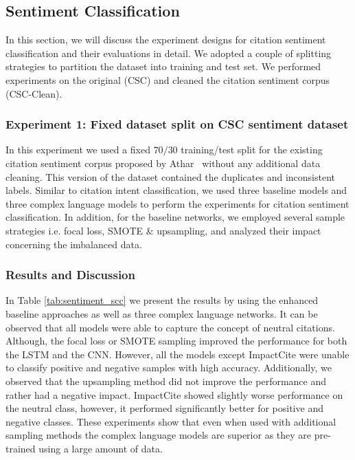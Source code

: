 \documentclass[runningheads]{llncs}
\begin{document}
\subsection{Sentiment Classification}
In this section, we will discuss the experiment designs for citation sentiment classification and their evaluations in detail. We adopted a couple of splitting strategies to partition the dataset into training and test set. We performed experiments on the original (CSC) and cleaned the citation sentiment corpus (CSC-Clean).

\subsubsection{Experiment 1: Fixed dataset split on CSC sentiment dataset}
In this experiment we used a fixed $70/30$ training/test split for the existing citation sentiment corpus proposed by Athar~\cite{athar:2011:SS} without any additional data cleaning. This version of the dataset contained the duplicates and inconsistent labels. Similar to citation intent classification, we used three baseline models and three complex language models to perform the experiments for citation sentiment classification. In addition, for the baseline networks, we employed several sample strategies i.e. focal loss, SMOTE \& upsampling, and analyzed their impact concerning the imbalanced data.

\subsubsection{Results and Discussion}
In Table \ref{tab:sentiment_scc} we present the results by using the enhanced baseline approaches as well as three complex language networks. It can be observed that all models were able to capture the concept of neutral citations. Although, the focal loss or SMOTE sampling improved the performance for both the LSTM and the CNN. However, all the models except ImpactCite were unable to classify positive and negative samples with high accuracy. Additionally, we observed that the upsampling method did not improve the performance and rather had a negative impact. ImpactCite showed slightly worse performance on the neutral class, however, it performed significantly better for positive and negative classes. These experiments show that even when used with additional sampling methods the complex language models are superior as they are pre-trained using a large amount of data.
\end{document}
